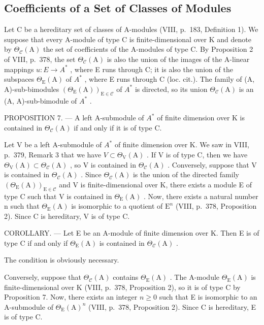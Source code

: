 \subsection{Coefficients of a Set of Classes of Modules}

Let C be a hereditary set of classes of A-modules (VIII, p.~183, Definition 1). We suppose that every A-module of type C is finite-dimensional over K and denote by \(\Theta_{\mathcal{C}}(\mathrm{A})\) the set of coefficients of the A-modules of type C. By Proposition 2 of VIII, p.~378, the set \(\Theta_{\mathcal{C}}(\mathrm{A})\) is also the union of the images of the A-linear mappings \(u: E \to A^{*}\) , where E runs through C; it is also the union of the subspaces \(\Theta_{\mathrm{E}}(\mathrm{A})\) of \(A^{*}\) , where E runs through C (loc. cit.). The family of (A, A)-sub-bimodules \((\Theta_{\mathrm{E}}(\mathrm{A}))_{\mathrm{E} \in \mathcal{C}}\) of \(A^{*}\) is directed, so its union \(\Theta_{\mathcal{C}}(\mathrm{A})\) is an (A, A)-sub-bimodule of \(A^{*}\) .

PROPOSITION 7. --- A left A-submodule of \(A^{*}\) of finite dimension over K is contained in \(\Theta_{\mathcal{C}}(\mathrm{A})\) if and only if it is of type C.

Let V be a left A-submodule of \(A^{*}\) of finite dimension over K. We saw in VIII, p.~379, Remark 3 that we have \(V \subset \Theta_{\mathrm{V}}(\mathrm{A})\) . If V is of type C, then we have \(\Theta_{\mathrm{V}}(\mathrm{A}) \subset \Theta_{\mathcal{C}}(\mathrm{A})\) , so V is contained in \(\Theta_{\mathcal{C}}(\mathrm{A})\) . Conversely, suppose that V is contained in \(\Theta_{\mathcal{C}}(\mathrm{A})\) . Since \(\Theta_{\mathcal{C}}(\mathrm{A})\) is the union of the directed family \((\Theta_{\mathrm{E}}(\mathrm{A}))_{\mathrm{E}\in\mathcal{C}}\) and V is finite-dimensional over K, there exists a module E of type C such that V is contained in \(\Theta_{\mathrm{E}}(\mathrm{A})\) . Now, there exists a natural number n such that \(\Theta_{\mathrm{E}}(\mathrm{A})\) is isomorphic to a quotient of \(\mathrm{E}^{n}\) (VIII, p.~378, Proposition 2). Since C is hereditary, V is of type C.

COROLLARY. --- Let E be an A-module of finite dimension over K. Then E is of type C if and only if \(\Theta_{\mathrm{E}}(\mathrm{A})\) is contained in \(\Theta_{\mathcal{C}}(\mathrm{A})\) .

The condition is obviously necessary.

Conversely, suppose that \(\Theta_{\mathcal{C}}(\mathrm{A})\) contains \(\Theta_{\mathrm{E}}(\mathrm{A})\) . The A-module \(\Theta_{\mathrm{E}}(\mathrm{A})\) is finite-dimensional over K (VIII, p.~378, Proposition 2), so it is of type C by Proposition 7. Now, there exists an integer \(n \geqslant 0\) such that E is isomorphic to an A-submodule of \(\Theta_{\mathrm{E}}(\mathrm{A})^{n}\) (VIII, p.~378, Proposition 2). Since C is hereditary, E is of type C.

